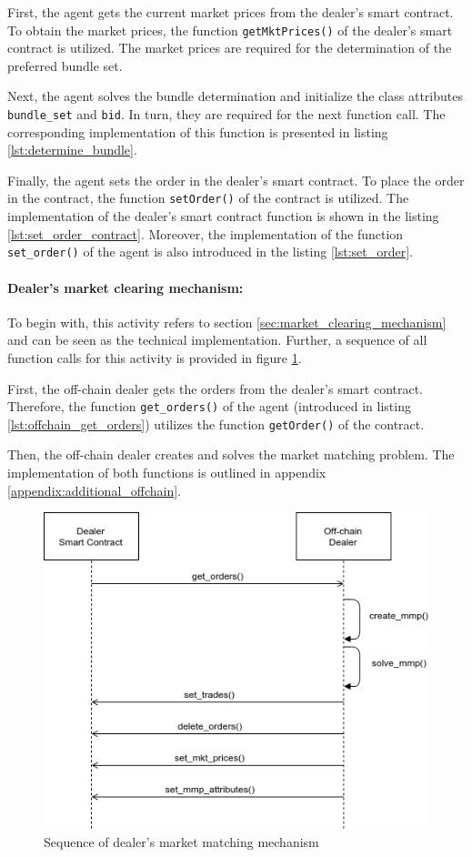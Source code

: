 First, the agent gets the current market prices from the dealer's smart contract.
To obtain the market prices, the function \verb|getMktPrices()| of the dealer's smart contract is utilized.
The market prices are required for the determination of the preferred bundle set.

Next, the agent solves the bundle determination and initialize the class attributes
\verb|bundle_set| and \verb|bid|.
In turn, they are required for the next function call.
The corresponding implementation of this function is presented in listing \ref{lst:determine_bundle}.

Finally, the agent sets the order in the dealer's smart contract.
To place the order in the contract, the function \verb|setOrder()| of the contract is utilized.
The implementation of the dealer's smart contract function is shown in the listing \ref{lst:set_order_contract}.
Moreover, the implementation of the function \verb|set_order()| of the agent is 
also introduced in the listing \ref{lst:set_order}.

\paragraph{Dealer's market clearing mechanism:}
To begin with, this activity refers to section \ref{sec:market_clearing_mechanism} and can be seen as
the technical implementation. Further, a sequence of all function 
calls for this activity is provided in figure \ref{figure:dealers_mmp}.

First, the off-chain dealer gets the orders from the dealer's smart contract.
Therefore, the function \verb|get_orders()| of the agent (introduced in listing \ref{lst:offchain_get_orders})
utilizes the function \verb|getOrder()| of the contract.

Then, the off-chain dealer creates and solves the market matching problem.
The implementation of both functions is outlined in appendix \ref{appendix:additional_offchain}.

\begin{figure}[htbp]
	\centering
	\includegraphics[width=.8\linewidth]{./figures/dealers_mmp.png}
	\caption{Sequence of dealer's market matching mechanism}
	\label{figure:dealers_mmp}
\end{figure}

